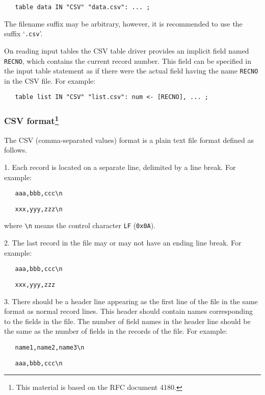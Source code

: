 \documentclass[10pt]{article}
\begin{document}
\verb|   table data IN "CSV" "data.csv": ... ;|

\medskip

The filename suffix may be arbitrary, however, it is recommended to use
the suffix `\verb|.csv|'.

On reading input tables the CSV table driver provides an implicit field
named \verb|RECNO|, which contains the current record number. This
field can be specified in the input table statement as if there were
the actual field having the name \verb|RECNO| in the CSV file. For
example:

\medskip

\verb|   table list IN "CSV" "list.csv": num <- [RECNO], ... ;|

\subsubsection*{CSV format\footnote{This material is based on the RFC
document 4180.}}

The CSV (comma-separated values) format is a plain text file format
defined as follows.

1. Each record is located on a separate line, delimited by a line
break. For example:

\medskip

\verb|   aaa,bbb,ccc\n|

\verb|   xxx,yyy,zzz\n|

\medskip

\noindent
where \verb|\n| means the control character \verb|LF| ({\tt 0x0A}).

\newpage

2. The last record in the file may or may not have an ending line
break. For example:

\medskip

\verb|   aaa,bbb,ccc\n|

\verb|   xxx,yyy,zzz|

\medskip

3. There should be a header line appearing as the first line of the
file in the same format as normal record lines. This header should
contain names corresponding to the fields in the file. The number of
field names in the header line should be the same as the number of
fields in the records of the file. For example:

\medskip

\verb|   name1,name2,name3\n|

\verb|   aaa,bbb,ccc\n|
\end{document}
